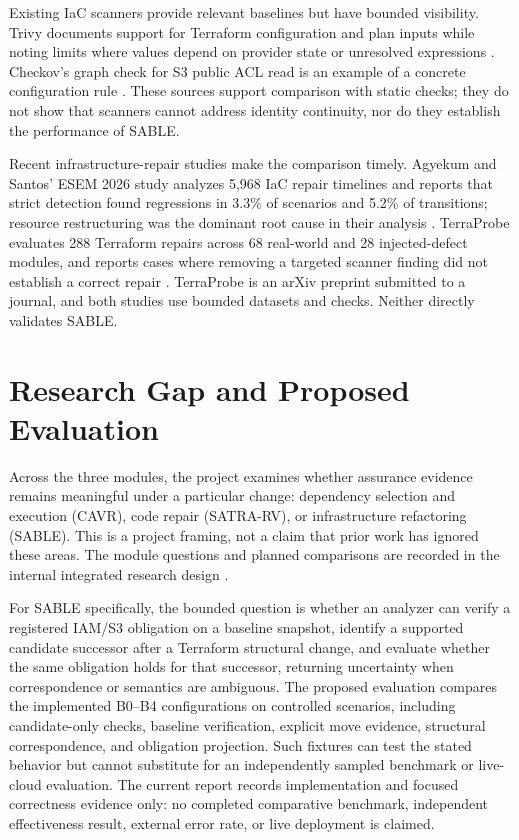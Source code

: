 Existing IaC scanners provide relevant baselines but have bounded visibility. Trivy documents support for Terraform configuration and plan inputs while noting limits where values depend on provider state or unresolved expressions \cite{trivyTerraform}. Checkov's graph check for S3 public ACL read is an example of a concrete configuration rule \cite{checkovS3Graph}. These sources support comparison with static checks; they do not show that scanners cannot address identity continuity, nor do they establish the performance of SABLE.

Recent infrastructure-repair studies make the comparison timely. Agyekum and Santos' ESEM 2026 study analyzes 5,968 IaC repair timelines and reports that strict detection found regressions in 3.3\% of scenarios and 5.2\% of transitions; resource restructuring was the dominant root cause in their analysis \cite{agyekum2026fixing}. TerraProbe evaluates 288 Terraform repairs across 68 real-world and 28 injected-defect modules, and reports cases where removing a targeted scanner finding did not establish a correct repair \cite{alsaid2026terraprobe}. TerraProbe is an arXiv preprint submitted to a journal, and both studies use bounded datasets and checks. Neither directly validates SABLE.

\section{Research Gap and Proposed Evaluation}
Across the three modules, the project examines whether assurance evidence remains meaningful under a particular change: dependency selection and execution (CAVR), code repair (SATRA-RV), or infrastructure refactoring (SABLE). This is a project framing, not a claim that prior work has ignored these areas. The module questions and planned comparisons are recorded in the internal integrated research design \cite{asentIntegratedResearchDesign}.

For SABLE specifically, the bounded question is whether an analyzer can verify a registered IAM/S3 obligation on a baseline snapshot, identify a supported candidate successor after a Terraform structural change, and evaluate whether the same obligation holds for that successor, returning uncertainty when correspondence or semantics are ambiguous. The proposed evaluation compares the implemented B0--B4 configurations on controlled scenarios, including candidate-only checks, baseline verification, explicit move evidence, structural correspondence, and obligation projection. Such fixtures can test the stated behavior but cannot substitute for an independently sampled benchmark or live-cloud evaluation. The current report records implementation and focused correctness evidence only: no completed comparative benchmark, independent effectiveness result, external error rate, or live deployment is claimed.

